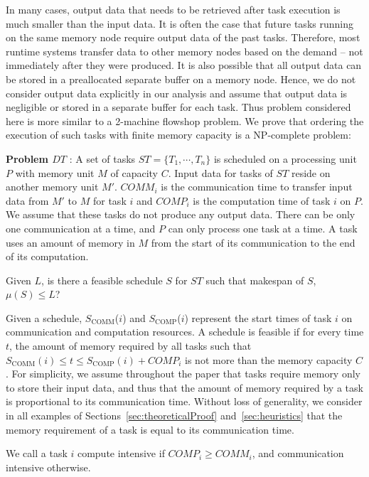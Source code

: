 \documentclass[sigconf]{acmart}
\newcommand{\scomm}{\ensuremath{{S}_{\text{COMM}}}}
\newcommand{\scomp}{\ensuremath{{S}_{\text{COMP}}}}
\begin{document}
	
	In many cases, output data that needs to be retrieved after task execution is much smaller than the input data. It is often the case that future tasks running on the same memory node require output data of the past tasks. Therefore, most runtime systems transfer data to other memory nodes based on the demand -- not immediately after they were produced. It is also possible that all output data can be stored in a preallocated separate buffer on a memory node. Hence, we do not consider output data explicitly in our analysis and assume that output data is negligible or stored in a separate buffer for each task. Thus problem considered here is more similar to a 2-machine flowshop problem. We prove that ordering the execution of such tasks with finite memory capacity is a NP-complete problem: %
	
	\medskip
	\noindent\textbf{Problem $DT$} : A set of tasks $ST=\{T_1,
	\cdots, T_n\}$ is scheduled on a processing unit $P$ with
	memory unit $M$ of capacity $C$. Input data for tasks of $ST$
	reside on another memory unit $M'$. $COMM_i$ is the communication time to
	transfer input data from $M'$ to $M$ for task $i$ and $COMP_i$
	is the computation time of task $i$ on $P$. We assume that these
	tasks do not produce any output data. There can be only one
	communication at a time, and $P$ can only process one task at
	a time. A task uses an amount of memory in  $M$ from the
	start of its communication to the end of its computation.
	
	\noindent Given $L$, is there a feasible schedule $S$ for $ST$ such that
	makespan of $S$, $\mu(S) \le L$?
	
	
	Given a schedule, \scomm($i$) and \scomp($i$) represent the
	start times of task $i$ on communication and computation
	resources. A schedule is feasible if for every time $t$, the
	amount of memory required by all tasks such that $\scomm(i) \leq t
	\leq \scomp(i) + COMP_i$ is not more than the memory capacity
	$C$. 
	For simplicity, we assume throughout the paper that tasks
	require memory only to store their input data, and thus that
	the amount of memory required by a task is proportional to its
	communication time. Without loss of generality, we consider in
	all examples of Sections~\ref{sec:theoreticalProof}
	and~\ref{sec:heuristics} that the memory requirement of a task
	is equal to its communication time.
	
	We call a task $i$ compute intensive if $COMP_i \ge COMM_i$, and
	communication intensive otherwise.
	
\end{document}
